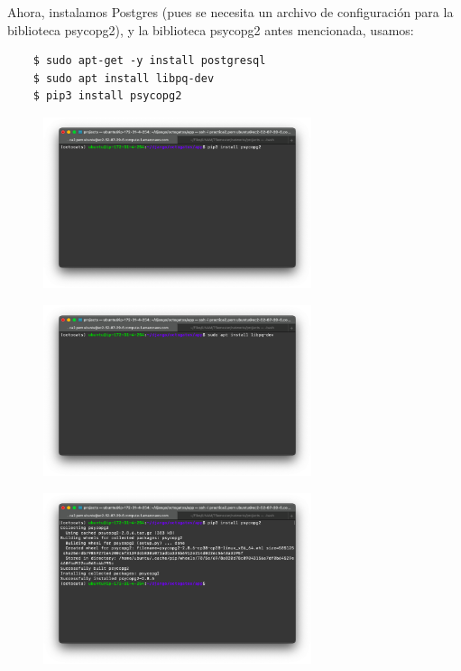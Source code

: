 \documentclass{article}
\begin{document}
\begin{enumerate}
    Ahora, instalamos Postgres (pues se necesita un archivo de configuración
    para la biblioteca psycopg2), y la biblioteca psycopg2 antes mencionada,
    usamos:

    \begin{lstlisting}
    $ sudo apt-get -y install postgresql
    $ sudo apt install libpq-dev
    $ pip3 install psycopg2
    \end{lstlisting}

    \begin{figure}[H]
      \centering
      \includegraphics[width=0.70\textwidth]{AppServer/i8}
    \end{figure}

    \begin{figure}[H]
      \centering
      \includegraphics[width=0.70\textwidth]{AppServer/i9}
    \end{figure}

    \begin{figure}[H]
      \centering
      \includegraphics[width=0.70\textwidth]{AppServer/i10}
    \end{figure}


\end{enumerate}
\end{document}

